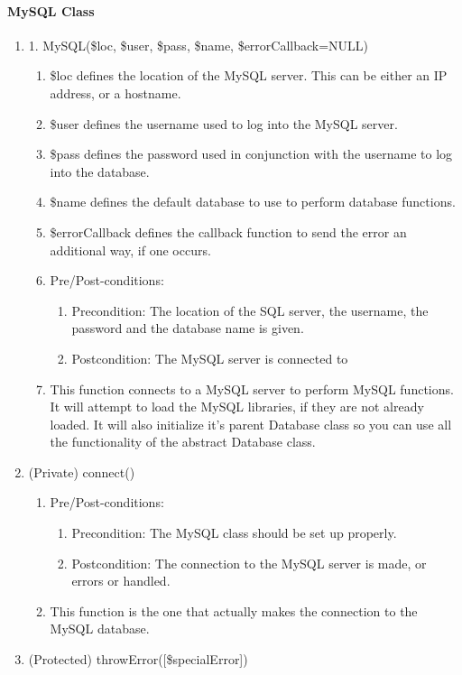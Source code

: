\documentclass{article}
\begin{document}
\paragraph{MySQL Class}
\begin{enumerate}
\item  1. MySQL(\$loc, \$user, \$pass, \$name, \$errorCallback=NULL)
\begin{enumerate}
\item \$loc defines the location of the MySQL server. This can be either an IP address, or a hostname.
\item \$user defines the username used to log into the MySQL server.
\item \$pass defines the password used in conjunction with the username to log into the database.
\item \$name defines the default database to use to perform database functions.
\item \$errorCallback defines the callback function to send the error an additional way, if one occurs.
\item Pre/Post-conditions:
\begin{enumerate}
\item Precondition: The location of the SQL server, the username, the password and the database name is given.
\item Postcondition: The MySQL server is connected to
\end{enumerate}
\item This function connects to a MySQL server to perform MySQL functions. It will attempt to load the MySQL libraries, if they are not already loaded. It will also initialize it's parent Database class so you can use all the functionality of the abstract Database class.
\end{enumerate}
\item (Private) connect()
\begin{enumerate}
\item Pre/Post-conditions:
\begin{enumerate}
\item Precondition: The MySQL class should be set up properly.
\item Postcondition: The connection to the MySQL server is made, or errors or handled.
\end{enumerate}
\item This function is the one that actually makes the connection to the MySQL database.
\end{enumerate}
\item (Protected) throwError([\$specialError])

\end{enumerate}
\end{document}
